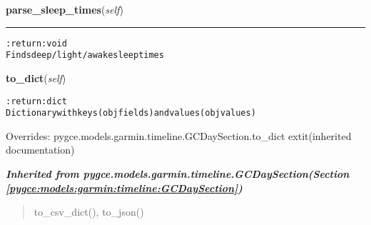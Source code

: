     \label{pygce:models:garmin:timeline:GCDaySleep:parse_sleep_times}

    \vspace{0.5ex}

\hspace{.8\funcindent}\begin{boxedminipage}{\funcwidth}

    \raggedright \textbf{parse\_sleep\_times}(\textit{self})

    \vspace{-1.5ex}

    \rule{\textwidth}{0.5\fboxrule}
\setlength{\parskip}{2ex}
\begin{alltt}

:return: void
    Finds deep/light/awake sleep times
\end{alltt}

\setlength{\parskip}{1ex}
    \end{boxedminipage}

    \vspace{0.5ex}

\hspace{.8\funcindent}\begin{boxedminipage}{\funcwidth}

    \raggedright \textbf{to\_dict}(\textit{self})

\setlength{\parskip}{2ex}
\begin{alltt}

:return: dict
    Dictionary with keys (obj fields) and values (obj values)
\end{alltt}

\setlength{\parskip}{1ex}
      Overrides: pygce.models.garmin.timeline.GCDaySection.to\_dict 	extit{(inherited documentation)}

    \end{boxedminipage}


\large{\textbf{\textit{Inherited from pygce.models.garmin.timeline.GCDaySection\textit{(Section \ref{pygce:models:garmin:timeline:GCDaySection})}}}}

\begin{quote}
to\_csv\_dict(), to\_json()
\end{quote}

